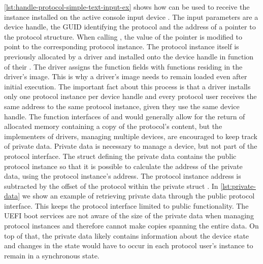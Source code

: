 \autoref{lst:handle-protocol-simple-text-input-ex} shows how  can be used to receive the  instance installed on the active console input device \cite[Section 4.3]{uefi-spec}.
The input parameters are a device handle, the \ac{GUID} identifying the protocol and the address of a pointer to the protocol structure.
When calling , the value of the pointer is modified to point to the corresponding protocol instance.
The protocol instance itself is previously allocated by a driver and installed onto the device handle in  function of their .
The driver assigns the function fields with functions residing in the driver's image.
This is why a driver's image needs to remain loaded even after initial execution.
The important fact about this process is that a driver installs only one protocol instance per device handle and every protocol user receives the same address to the same protocol instance, given they use the same device handle.
The function interfaces of  and  would generally allow for the return of allocated memory containing a copy of the protocol's content, but the implementers of drivers, managing multiple devices, are encouraged to keep track of private data.
Private data is necessary to manage a device, but not part of the protocol interface.
The struct defining the private data contains the public protocol instance so that it is possible to calculate the address of the private data, using the protocol instance's address.
The protocol instance address is subtracted by the offset of the protocol within the private struct \cite[Section 8]{tianocore-edk2-driver-writer-s-guide}.
In \autoref{lst:private-data} we show an example of retrieving private data through the public protocol interface.
This keeps the protocol interface limited to public functionality.
The \ac{UEFI} boot services are not aware of the size of the private data when managing protocol instances and therefore cannot make copies spanning the entire data.
On top of that, the private data likely contains information about the device state and changes in the state would have to occur in each protocol user's instance to remain in a synchronous state.

\vspace{1em}



